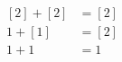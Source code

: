 \documentclass[preview]{standalone}
\begin{document}
\begin{align*}
\begin{aligned}[2] + [2] &= [2] \\1 + [1] &= [2] \\1 + 1 &= 1 \end{aligned}
\end{align*}
\end{document}
